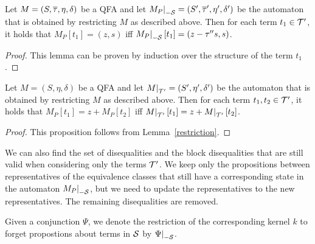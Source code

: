 \begin{lemma}\label{restriction}
    Let $M = (S, \overline{\tau}, \eta, \delta)$ be a QFA and let $\restr{M_P}{-\Set} = (S', \otau', \eta', \delta')$ be the automaton that is obtained by restricting $M$ as described above.
    Then for each term $t_1 \in \mathcal{T}'$, it holds that $M_P[t_1] = (z, s)$ iff $\restr{M_P}{-\Set}[t_1] = (z - \repr s, s)$.
\end{lemma}
\begin{proof}
    This lemma can be proven by induction over the structure of the term $t_1$.
\end{proof}

\begin{proposition}
    Let $M = (S, \eta, \delta)$ be a QFA and let $\restr{M}{\T'} = (S', \eta', \delta')$ be the automaton that is obtained by restricting $M$ as described above.
    Then for each term $t_1, t_2 \in \mathcal{T}'$, it holds that $M_P[t_1] = z + M_P[t_2]$ iff $\restr{M}{\T'}[t_1] = z + \restr{M}{\T'}[t_2]$.
\end{proposition}
\begin{proof}
    This proposition follows from Lemma~\ref{restriction}.
\end{proof}

We can also find the set of disequalities and the block disequalities that are still valid when considering only the terms $\mathcal{T}'$.
We keep only the propositions between representatives of the equivalence classes that
still have a corresponding state in the automaton $\restr{M_P}{-\Set}$, but we need to update the representatives to the new representatives.
The remaining disequalities are removed.

Given a conjunction $\Psi$, we denote the restriction of the corresponding kernel $k$ to forget propostions about terms in $\mathcal{S}$ by $\restr{\Psi}{-\Set}$.

